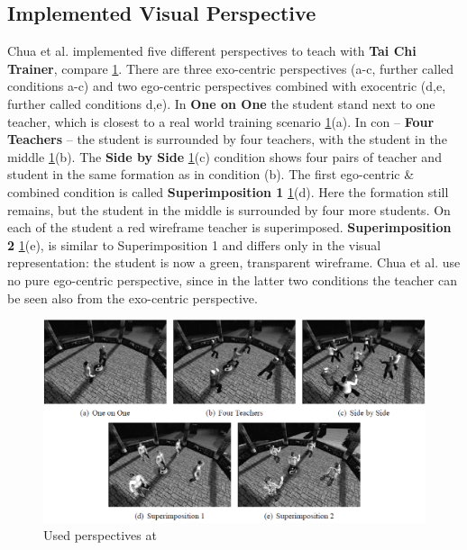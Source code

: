\subsection{Implemented Visual Perspective}
Chua et al. \cite{Chua} implemented five different perspectives to teach with \textbf{Tai Chi Trainer}, compare \ref{fig:taichiperspectives}. There are three exo-centric perspectives (a-c, further called conditions a-c) and two ego-centric perspectives combined with exocentric (d,e, further called conditions d,e). In \textbf{One on One} the student stand next to one teacher, which is closest to a real world training scenario \ref{fig:taichiperspectives}(a). In con \--- \textbf{Four Teachers} \--- the student is surrounded by four teachers, with the student in the middle \ref{fig:taichiperspectives}(b). The \textbf{Side by Side} \ref{fig:taichiperspectives}(c) condition shows four pairs of teacher and student in the same formation as in condition (b). The first ego-centric \& combined condition is called \textbf{Superimposition 1} \ref{fig:taichiperspectives}(d). Here the formation still remains, but the student in the middle is surrounded by four more students. On each of the student a red wireframe teacher is superimposed. \textbf{Superimposition 2} \ref{fig:taichiperspectives}(e), is similar to Superimposition 1 and differs only in the visual representation: the student is now a green, transparent wireframe. Chua et al. use no pure ego-centric perspective, since in the latter two conditions the teacher can be seen also from the exo-centric perspective.
\begin{figure}
	\centering
	\includegraphics[width=1.0\textwidth]{img/taichi_perspectives.png}
	\caption{Used perspectives at \cite{Chua}}
	\label{fig:taichiperspectives}
\end{figure}\\
